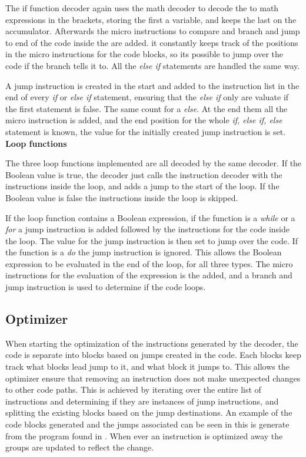 The if function decoder again uses the math decoder to decode the to math expressions in the brackets, storing the first a variable, and keeps the last on the accumulator. Afterwards the micro instructions to compare and branch and jump to end of the code inside the  are added. it constantly keeps track of the positions in the micro instructions for the code blocks, so its possible to jump over the code if the branch tells it to. All the \textit{else if} statements are handled the same way.

A jump instruction is created in the start and added to the instruction list in the end of every \textit{if} or \textit{else if} statement, ensuring that the \textit{else if} only are valuate if the first statement is false. The same count for a \textit{else}. At the end them all the micro instruction is added, and the end position for the whole \textit{if, else if, else} statement is known, the value for the initially created jump instruction is set.\\
 
\textbf{Loop functions}

The three loop functions implemented are all decoded by the same decoder. If the Boolean value is true, the decoder just calls the instruction decoder with the instructions inside the loop, and adds a jump to the start of the loop. If the Boolean value is false the instructions inside the loop is skipped. 

If the loop function contains a Boolean expression, if the function is a \textit{while} or a \textit{for} a jump instruction is added followed by the instructions for the code inside the loop. The value for the jump instruction is then set to jump over the code. If the function is a \textit{do} the jump instruction is ignored. This allows the Boolean expression to be evaluated in the end of the loop, for all three types. The micro instructions for the evaluation of the expression is the added, and a branch and jump instruction is used to determine if the code loops. 

\subsection{Optimizer}

When starting the optimization of the instructions generated by the decoder, the code is separate into blocks based on jumps created in the code. Each blocks keep track what blocks lead jump to it, and what block it jumps to. This allows the optimizer ensure that removing an instruction does not make unexpected changes to other code paths. This is achieved by iterating over the entire list of instructions and determining if they are instances of jump instructions, and splitting the existing blocks based on the jump destinations. An example of the code blocks generated and the jumps associated can be seen in  this is generate from the program found in . When ever an instruction is optimized away the groups are updated to reflect the change.

